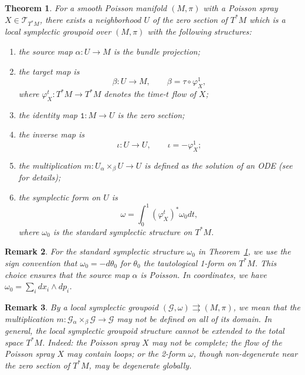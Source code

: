 \documentclass{amsart}
\newtheorem{theorem}{Theorem}[section]
\newtheorem{remark}[theorem]{Remark}
\numberwithin{equation}{section}
\newcommand{\cG}{\mathcal{G}}
\newcommand{\cT}{\mathcal{T}}
\newcommand{\rra}{\rightrightarrows}
\begin{document}
\begin{theorem} 
  \cite{CM11, CMS17} 
  \label{thm:poissp}
  For a smooth Poisson manifold $(M, \pi)$ with a Poisson spray $X \in \cT_{T^*M}$, there exists a neighborhood $U$ of the zero section of $T^*M$ which is a local symplectic groupoid over $(M, \pi)$ with the following structures:
  \begin{enumerate}
    \item the source map $\alpha: U \to M$ is the bundle projection;
    \item the target map is
      \[\beta: U \to M, \qquad \beta = \tau \circ \varphi_X^1,\]
      where $\varphi_X^t: T^*M \to T^*M$ denotes the time-$t$ flow of $X$;
    \item the identity map $\mathtt{1}: M \to U$ is the zero section;
    \item the inverse map is
      \[\iota: U \to U, \qquad \iota = -\varphi_X^1;\]
    \item the multiplication $m: U {_\alpha \times_\beta} U \to U$ is defined as the solution of an ODE (see \cite{CMS17} for details);
    \item the symplectic form on $U$ is
      \[\omega = \int_{0}^{1} (\varphi_X^t)^*\omega_0 dt,\]
      where $\omega_0$ is the standard symplectic structure on $T^*M$.
  \end{enumerate}
\end{theorem}

\begin{remark}
  For the standard symplectic structure $\omega_0$ in Theorem~\ref{thm:poissp}, we use the sign convention that $\omega_0 = - d \theta_0$ for $\theta_0$ the tautological 1-form on $T^*M$.
  This choice ensures that the source map $\alpha$ is Poisson.
  In coordinates, we have $\omega_0 = \sum_i d x_i \wedge d p_i$.
\end{remark}

\begin{remark}
  By a local symplectic groupoid $(\cG, \omega) \rra (M, \pi)$, we mean that the multiplication $m: \cG {_\alpha \times_\beta} \cG \to \cG$ may not be defined on all of its domain.
  In general, the local symplectic groupoid structure cannot be extended to the total space $T^*M$.
  Indeed: the Poisson spray $X$ may not be complete; the flow of the Poisson spray $X$ may contain loops; or the 2-form $\omega$, though non-degenerate near the zero section of $T^*M$, may be degenerate globally.
\end{remark}
\end{document}
